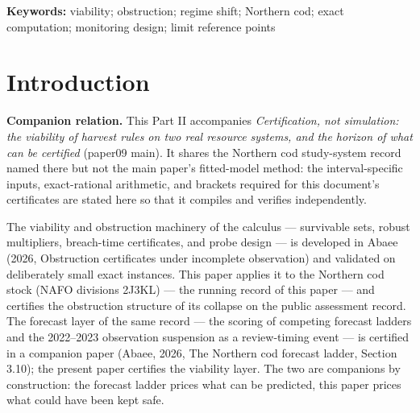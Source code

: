 \documentclass[10pt,twocolumn]{article}
\theoremstyle{plain}
\theoremstyle{remark}
\begin{document}
\begin{abstract}
reassessment vintage's published 95\% bands, exactly the four
collapse-era steps 1991--1995 certify as declines and the 1993 floor
breach holds at the band's upper edge (\(115 < 276\)), while no
reference-decade step certifies; the reference decade's window profile
shows every subwindow of horizon four or more growing (the sustained-decline
reading holds only at horizons one to three); and the vintage's own
1954--1982 record has the window opening at \(28.3\%\) of the 1962 peak,
three years after a prior floor episode (1977--1979). The collapse is present in the raw survey index (a certified
factor of \(\tfrac{21797}{2127417}\) over 1989--1994, falling \(2.6\)
times further than the assessment series over their common window);
the forage-fish covariate collapses in the same annual step in which
the mortality diagnostic crosses \(M=1\), two steps before the floor
breach; and both assessment vintages re-cross the floor at the 2015
reading, with outcome years at most
\(\tfrac{44000}{88460} \approx 49.7\%\) of the reference point. Every
quantity is regenerated by an accompanying verification script in
exact rational arithmetic.
\end{abstract}

\textbf{Keywords:} viability; obstruction; regime shift; Northern cod;
exact computation; monitoring design; limit reference points

\section{Introduction}\label{intro}

\noindent\textbf{Companion relation.} This Part II accompanies
\emph{Certification, not simulation: the viability of harvest rules on two real resource systems,
and the horizon of what can be certified} (paper09 main). It shares the Northern cod
study-system record named there but not the main paper's fitted-model method:
the interval-specific inputs, exact-rational arithmetic, and brackets required for
this document's certificates are stated here so that it compiles and verifies independently.



The viability and obstruction machinery of the calculus --- survivable
sets, robust multipliers, breach-time certificates, and probe design ---
is developed in Abaee (2026, Obstruction certificates under incomplete observation) and validated on deliberately small exact
instances. This paper applies it to the Northern cod stock (NAFO
divisions 2J3KL) --- the running record of this paper --- and certifies
the obstruction structure of its collapse on the public assessment
record. The forecast layer of the
same record --- the scoring of competing forecast ladders and the
2022--2023 observation suspension as a review-timing event --- is
certified in a companion paper (Abaee, 2026, The Northern cod forecast ladder, Section 3.10); the
present paper certifies the viability layer. The two are companions by
construction: the forecast ladder prices what can be predicted, this
paper prices what could have been kept safe.
\end{document}
